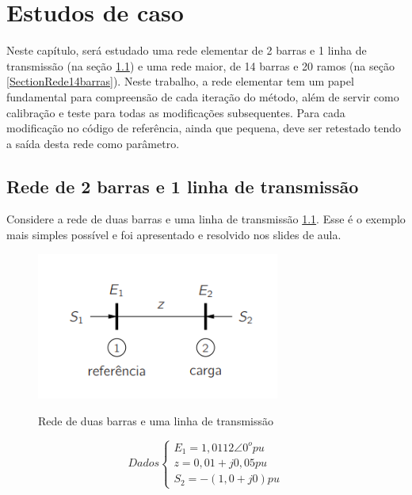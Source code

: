 \chapter{Estudos de caso}
\label{SectionEstudosDeCaso}
Neste capítulo, será estudado uma rede elementar de 2 barras e 1 linha de transmissão (na seção \ref{SectionRedePequena}) e uma rede maior, de 14 barras e 20 ramos (na seção \ref{SectionRede14barras}). Neste trabalho, a rede elementar tem um papel fundamental para compreensão de cada iteração do método, além de servir como calibração e teste para todas as modificações subsequentes. Para cada modificação no código de referência, ainda que pequena, deve ser retestado tendo a saída desta rede como parâmetro.
\section{Rede de 2 barras e 1 linha de transmissão}
\label{SectionRedePequena}
Considere a rede de duas barras e uma linha de transmissão \ref{FigRede2barras1linha}. Esse é o exemplo mais simples possível e foi apresentado e resolvido nos slides de aula.\\
\begin{figure}[!htb]
\caption{Rede de duas barras e uma linha de transmissão}
 \centering %
\includegraphics[width=8cm]{figuras/rede2barras1linha.PNG} 
\label{FigRede2barras1linha}
\end{figure}

\begin{equation}
Dados \left\{    \begin{array}{lll}
                E_1=1,0112	\angle 0^o pu\\
                z = 0,01+j0,05 pu\\
                S_2 = -(1,0+j0) pu
            \end{array}\right.
    \label{rede1_dados}
\end{equation}
